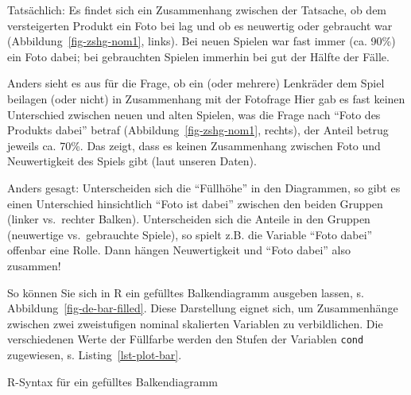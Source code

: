 \documentclass[
  letterpaper,
]{scrbook}
\newenvironment{Shaded}{\begin{snugshade}}{\end{snugshade}}
\newcommand{\AttributeTok}[1]{\textcolor[rgb]{0.40,0.45,0.13}{#1}}
\newcommand{\CommentTok}[1]{\textcolor[rgb]{0.37,0.37,0.37}{#1}}
\newcommand{\FunctionTok}[1]{\textcolor[rgb]{0.28,0.35,0.67}{#1}}
\newcommand{\NormalTok}[1]{\textcolor[rgb]{0.00,0.23,0.31}{#1}}
\newcommand{\SpecialCharTok}[1]{\textcolor[rgb]{0.37,0.37,0.37}{#1}}
\newcommand{\StringTok}[1]{\textcolor[rgb]{0.13,0.47,0.30}{#1}}
\theoremstyle{definition}
\theoremstyle{definition}
\theoremstyle{definition}
\theoremstyle{remark}
\begin{document}
Tatsächlich: Es findet sich ein Zusammenhang zwischen der Tatsache, ob
dem versteigerten Produkt ein Foto bei lag und ob es neuwertig oder
gebraucht war (Abbildung~\ref{fig-zshg-nom1}, links). Bei neuen Spielen
war fast immer (ca. 90\%) ein Foto dabei; bei gebrauchten Spielen
immerhin bei gut der Hälfte der Fälle.

Anders sieht es aus für die Frage, ob ein (oder mehrere) Lenkräder dem
Spiel beilagen (oder nicht) in Zusammenhang mit der Fotofrage Hier gab
es fast keinen Unterschied zwischen neuen und alten Spielen, was die
Frage nach ``Foto des Produkts dabei'' betraf
(Abbildung~\ref{fig-zshg-nom1}, rechts), der Anteil betrug jeweils ca.
70\%. Das zeigt, dass es keinen Zusammenhang zwischen Foto und
Neuwertigkeit des Spiels gibt (laut unseren Daten).

Anders gesagt: Unterscheiden sich die ``Füllhöhe'' in den Diagrammen, so
gibt es einen Unterschied hinsichtlich ``Foto ist dabei'' zwischen den
beiden Gruppen (linker vs.~rechter Balken). Unterscheiden sich die
Anteile in den Gruppen (neuwertige vs.~gebrauchte Spiele), so spielt
z.B. die Variable ``Foto dabei'' offenbar eine Rolle. Dann hängen
Neuwertigkeit und ``Foto dabei'' also zusammen!

So können Sie sich in R ein gefülltes Balkendiagramm ausgeben lassen, s.
Abbildung~\ref{fig-de-bar-filled}. Diese Darstellung eignet sich, um
Zusammenhänge zwischen zwei zweistufigen nominal skalierten Variablen zu
verbildlichen. Die verschiedenen Werte der Füllfarbe werden den Stufen
der Variablen \texttt{cond} zugewiesen, s. Listing~\ref{lst-plot-bar}.

\begin{codelisting}

\caption{\label{lst-plot-bar}R-Syntax für ein gefülltes Balkendiagramm}

\centering{

\begin{Shaded}
\begin{Highlighting}[]
\NormalTok{mariokart }\SpecialCharTok{\%\textgreater{}\%} 
  \FunctionTok{select}\NormalTok{(cond, stock\_photo) }\SpecialCharTok{\%\textgreater{}\%} 
  \FunctionTok{plot\_bar}\NormalTok{(}\AttributeTok{by =} \StringTok{"cond"}\NormalTok{)  }\CommentTok{\# aus dem Paket DataExplorer}
\end{Highlighting}
\end{Shaded}

}

\end{codelisting}%
\end{document}
